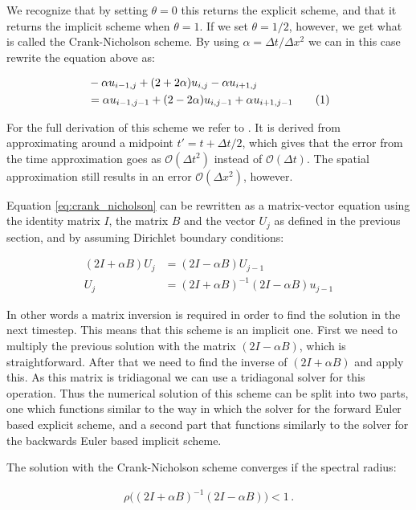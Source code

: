 \documentclass[reprint,english,notitlepage]{revtex4-1}  %
\newcommand\numberthis{\addtocounter{equation}{1}\tag{\theequation}}
\begin{document}
We recognize that by setting $\theta=0$ this returns the explicit scheme, and that it returns the implicit scheme when $\theta = 1$. If we set $\theta = 1/2$, however, we get what is called the Crank-Nicholson scheme. By using $\alpha = \Delta t / \Delta x^2$ we can in this case rewrite the equation above as:

\begin{align*}
&-\alpha u_{i-1,j} + (2 + 2 \alpha) u_{i,j} - \alpha u_{i+1,j} \\
&= \alpha u_{i-1,j-1} + (2-2\alpha) u_{i,j-1} + \alpha u_{i+1,j-1} \numberthis \label{eq:crank_nicholson}
\end{align*}

For the full derivation of this scheme we refer to \cite[p.~311]{Hjorth-Jensen2015}. It is derived from approximating around a midpoint $t' = t + \Delta t/2$, which gives that the error from the time approximation goes as $\mathcal{O}(\Delta t^2)$ instead of $\mathcal{O}(\Delta t)$. The spatial approximation still results in an error $\mathcal{O}(\Delta x^2)$, however.

Equation \eqref{eq:crank_nicholson} can be rewritten as a matrix-vector equation using the identity matrix $I$, the matrix $B$ and the vector $U_j$ as defined in the previous section, and by assuming Dirichlet boundary conditions:

\begin{align*}
(2I + \alpha B ) U_j &= (2I - \alpha B) U_{j-1} \\
U_j &= (2I + \alpha B)^{-1} (2I - \alpha B) u_{j-1}
\end{align*}

In other words a matrix inversion is required in order to find the solution in the next timestep. This means that this scheme is an implicit one. First we need to multiply the previous solution with the matrix $(2I - \alpha B)$, which is straightforward. After that we need to find the inverse of $(2I + \alpha B)$ and apply this. As this matrix is tridiagonal we can use a tridiagonal solver for this operation. Thus the numerical solution of this scheme can be split into two parts, one which functions similar to the way in which the solver for the forward Euler based explicit scheme, and a second part that functions similarly to the solver for the backwards Euler based implicit scheme.

The solution with the Crank-Nicholson scheme converges if the spectral radius:

\begin{align*}
\rho\bigg( (2I + \alpha B)^{-1} (2I - \alpha B) \bigg) < 1 \, .
\end{align*}
\end{document}
